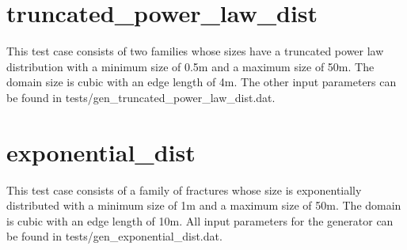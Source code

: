 \documentclass[letterpaper,10pt,english]{sphinxmanual}
\begin{document}
\section{truncated\_power\_law\_dist}
\label{\detokenize{tutorial:truncated-power-law-dist}}
This test case consists of two families whose sizes have a truncated power law distribution with a minimum size of 0.5m and a maximum size of 50m. The domain size is cubic with an edge length of 4m. The other input parameters can be found in tests/gen\_truncated\_power\_law\_dist.dat.

\begin{figure}[htbp]
\centering

\noindent{}
\end{figure}

\begin{DUlineblock}{0em}
\item[] 
\item[] 
\end{DUlineblock}

\begin{figure}[htbp]
\centering

\noindent{}
\end{figure}

\begin{DUlineblock}{0em}
\item[] 
\item[] 
\end{DUlineblock}

\begin{figure}[htbp]
\centering

\noindent{}
\end{figure}


\section{exponential\_dist}
\label{\detokenize{tutorial:exponential-dist}}
This test case consists of a family of fractures whose size is exponentially distributed with a minimum size of 1m and a maximum size of 50m. The domain is cubic with an edge length of 10m. All input parameters for the generator can be found in tests/gen\_exponential\_dist.dat.

\begin{figure}[htbp]
\centering

\noindent{}
\end{figure}
\end{document}
